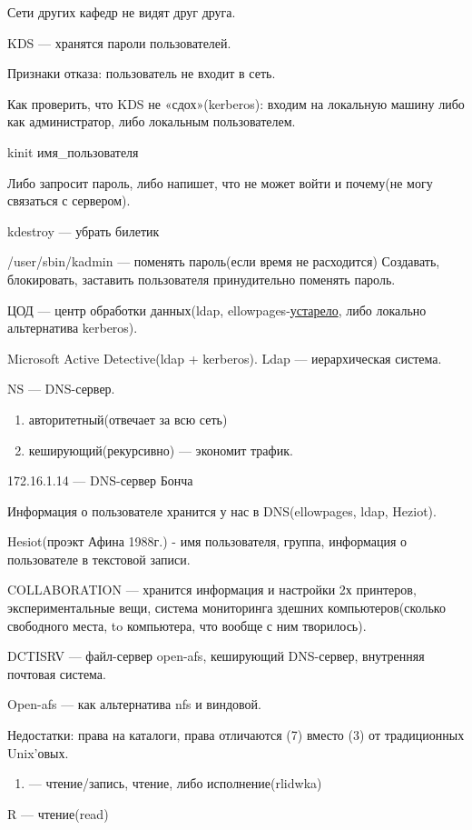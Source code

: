 \par 


\par 
Сети других кафедр не видят друг друга.
\par 
KDS — хранятся пароли пользователей.
\par 
Признаки отказа: пользователь не входит
в сеть.
\par 
Как проверить, что KDS не «сдох»(kerberos):
входим на локальную машину либо как
администратор, либо локальным
пользователем.
\par 
kinit имя\_пользователя
\par 
Либо запросит пароль, либо напишет, что
не может войти и почему(не могу связаться
с сервером).
\par 
kdestroy — убрать билетик
\par 
/user/sbin/kadmin — поменять пароль(если время
не расходится) Создавать, блокировать,
заставить пользователя принудительно
поменять пароль.
\par ЦОД
— центр обработки данных(ldap,
ellowpages-\underline{устарело},
либо локально альтернатива kerberos).
\par 
Microsoft Active Detective(ldap + kerberos). Ldap — иерархическая
система.
\par 
NS — DNS-сервер.
\begin{enumerate}
	\item \par 
	авторитетный(отвечает за всю сеть)
	\item \par 
	кеширующий(рекурсивно) — экономит
	трафик.
\end{enumerate}
\par 
172.16.1.14 — DNS-сервер Бонча
\par 
Информация о пользователе хранится у
нас в DNS(ellowpages, ldap, Heziot).
\par 
Hesiot(проэкт Афина 1988г.) - имя пользователя,
группа, информация о пользователе в
текстовой записи.
\par COLLABORATION
— хранится информация и настройки 2х
принтеров, экспериментальные вещи,
система мониторинга здешних
компьютеров(сколько свободного места,
to
компьютера, что вообще с ним творилось).
\par 
DCTISRV — файл-сервер open-afs, кеширующий
DNS-сервер, внутренняя почтовая система.
\par 
Open-afs — как альтернатива nfs и
виндовой.
\par 
Недостатки: права на каталоги,
права отличаются (7) вместо (3) от
традиционных Unix'овых.
\begin{enumerate}
	\item \par —
	чтение/запись,
	чтение, либо исполнение(rlidwka)
\end{enumerate}
\par 
R — чтение(read) 

